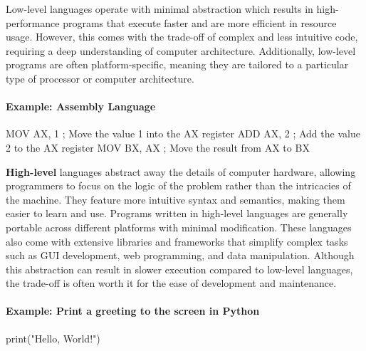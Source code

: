\documentclass[
  letterpaper,
  DIV=11,
  numbers=noendperiod]{scrreprt}
\let\oldparagraph\paragraph
\renewcommand{\paragraph}[1]{\oldparagraph{#1}\mbox{}}
\newenvironment{Shaded}{\begin{snugshade}}{\end{snugshade}}
\newcommand{\BuiltInTok}[1]{\textcolor[rgb]{0.00,0.23,0.31}{#1}}
\newcommand{\NormalTok}[1]{\textcolor[rgb]{0.00,0.23,0.31}{#1}}
\newcommand{\StringTok}[1]{\textcolor[rgb]{0.13,0.47,0.30}{#1}}
\begin{document}
Low-level languages operate with minimal abstraction which results in
high-performance programs that execute faster and are more efficient in
resource usage. However, this comes with the trade-off of complex and
less intuitive code, requiring a deep understanding of computer
architecture. Additionally, low-level programs are often
platform-specific, meaning they are tailored to a particular type of
processor or computer architecture.

\hypertarget{example-assembly-language}{%
\paragraph{Example: Assembly Language}\label{example-assembly-language}}

\begin{Shaded}
\begin{Highlighting}[]
\NormalTok{MOV AX, 1   ; Move the value 1 into the AX register}
\NormalTok{ADD AX, 2   ; Add the value 2 to the AX register}
\NormalTok{MOV BX, AX  ; Move the result from AX to BX}
\end{Highlighting}
\end{Shaded}

\textbf{High-level} languages abstract away the details of computer
hardware, allowing programmers to focus on the logic of the problem
rather than the intricacies of the machine. They feature more intuitive
syntax and semantics, making them easier to learn and use. Programs
written in high-level languages are generally portable across different
platforms with minimal modification. These languages also come with
extensive libraries and frameworks that simplify complex tasks such as
GUI development, web programming, and data manipulation. Although this
abstraction can result in slower execution compared to low-level
languages, the trade-off is often worth it for the ease of development
and maintenance.

\hypertarget{example-print-a-greeting-to-the-screen-in-python}{%
\paragraph{Example: Print a greeting to the screen in
Python}\label{example-print-a-greeting-to-the-screen-in-python}}

\begin{Shaded}
\begin{Highlighting}[]
\BuiltInTok{print}\NormalTok{(}\StringTok{"Hello, World!"}\NormalTok{)  }
\end{Highlighting}
\end{Shaded}
\end{document}
